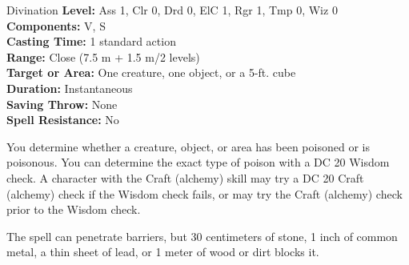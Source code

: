 {Divination}
{
	\textbf{Level:}
	Ass 1, Clr 0, Drd 0, ElC 1, Rgr 1, Tmp 0, Wiz 0\\
	\textbf{Components:}
	V, S\\
	\textbf{Casting Time:}
	1 standard action\\
	\textbf{Range:}
	Close (7.5 m + 1.5 m/2 levels)\\
	\textbf{Target or Area:}
	One creature, one object, or a 5-ft. cube\\
	\textbf{Duration:}
	Instantaneous\\
	\textbf{Saving Throw:}
	None\\
	\textbf{Spell Resistance:}
	No\\
}
{
	You determine whether a creature, object, or area has been poisoned or is poisonous. You can determine the exact type of poison with a DC 20 Wisdom check. A character with the Craft (alchemy) skill may try a DC 20 Craft (alchemy) check if the Wisdom check fails, or may try the Craft (alchemy) check prior to the Wisdom check.

	The spell can penetrate barriers, but 30 centimeters of stone, 1 inch of common metal, a thin sheet of lead, or 1 meter of wood or dirt blocks it.

}
